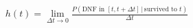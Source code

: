 \documentclass[preview]{standalone}
\begin{document}
\begin{align*}
h(t) = \lim_{\Delta t \to 0} \frac{P(\text{DNF in } [t, t+\Delta t] \,|\, \text{survived to } t)}{\Delta t}
\end{align*}
\end{document}
